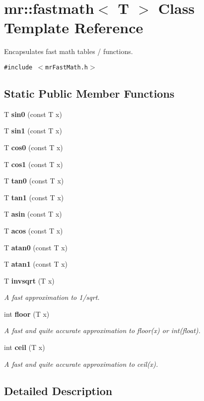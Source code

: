 \section{mr::fastmath$<$ T $>$ Class Template Reference}
\label{classmr_1_1fastmath}
Encapsulates fast math tables / functions.  


{\tt \#include $<$mr\-Fast\-Math.h$>$}

\subsection*{Static Public Member Functions}
\begin{CompactItemize}
\item 
T {\bf sin0} (const T x)
\item 
T {\bf sin1} (const T x)
\item 
T {\bf cos0} (const T x)
\item 
T {\bf cos1} (const T x)
\item 
T {\bf tan0} (const T x)
\item 
T {\bf tan1} (const T x)
\item 
T {\bf asin} (const T x)
\item 
T {\bf acos} (const T x)
\item 
T {\bf atan0} (const T x)
\item 
T {\bf atan1} (const T x)
\item 
T {\bf invsqrt} (T x)
\begin{CompactList}\small\item\em A fast approximation to 1/sqrt. \item\end{CompactList}\item 
int {\bf floor} (T x)
\begin{CompactList}\small\item\em A fast and quite accurate approximation to floor(x) or int(float). \item\end{CompactList}\item 
int {\bf ceil} (T x)
\begin{CompactList}\small\item\em A fast and quite accurate approximation to ceil(x). \item\end{CompactList}\end{CompactItemize}


\subsection{Detailed Description}
